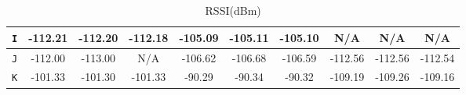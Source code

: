 \begin{table}
\begin{subtable}{\textwidth}
\begin{center}
\begin{tabular}{|c|c|c|c|c|c|c|c|c|c|}
                        \texttt{I} & -112.21                               & -112.20                                 & -112.18                                & -105.09        & -105.11        & -105.10        & N/A            & N/A            & N/A            \\ \hline
                        \texttt{J} & -112.00                               & -113.00                                 & N/A                                    & -106.62        & -106.68        & -106.59        & -112.56        & -112.56        & -112.54        \\ \hline
                        \texttt{K} & -101.33                               & -101.30                                 & -101.33                                & -90.29         & -90.34         & -90.32         & -109.19        & -109.26        & -109.16        \\ \hline
                  \end{tabular}
                  \caption{RSSI(dBm)}
                  \label{table:rssi4}
            \end{center}
      \end{subtable}%
      \label{tab:table1}
\end{table}


